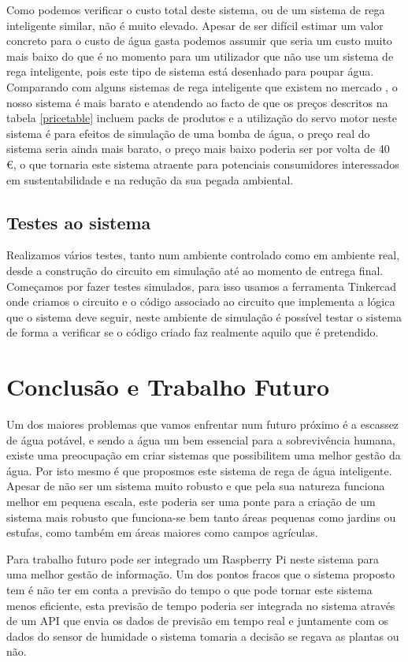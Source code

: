 \documentclass[conference]{IEEEtran}
\begin{document}
Como podemos verificar o custo total deste sistema, ou de um sistema de 
rega inteligente similar, não é muito elevado. Apesar de ser difícil estimar 
um valor concreto para o custo de água gasta podemos assumir que seria um custo 
muito mais baixo do que é no momento para um utilizador que não use um sistema de 
rega inteligente, pois este tipo de sistema está desenhado para poupar água. 
Comparando com alguns sistemas de rega inteligente que existem no 
mercado \cite{amazonOrbit} \cite{amazonNetro}, o nosso sistema é mais barato e 
atendendo ao facto de que os preços descritos na tabela \ref{pricetable} incluem packs de 
produtos e a utilização do servo motor neste sistema é para efeitos de simulação 
de uma bomba de água, o preço real do sistema seria ainda mais barato, o preço mais 
baixo poderia ser por volta de 40 €, o que tornaria este sistema atraente para 
potenciais consumidores interessados em sustentabilidade e na redução da sua pegada 
ambiental.

\subsection{Testes ao sistema}

Realizamos vários testes, tanto num ambiente controlado como em ambiente real, desde 
a construção do circuito em simulação até ao momento de entrega final. Começamos 
por fazer testes simulados, para isso usamos a ferramenta Tinkercad \cite{tinkercad} onde 
criamos o circuito e o código associado ao circuito que implementa a lógica 
que o sistema deve seguir, neste ambiente de simulação é possível testar 
o sistema de forma a verificar se o código criado faz realmente aquilo 
que é pretendido.

\section{Conclusão e Trabalho Futuro}

Um dos maiores problemas que vamos enfrentar num futuro próximo é a escassez de água potável,
e sendo a água um bem essencial para a sobrevivência humana, existe uma preocupação 
em criar sistemas que possibilitem uma melhor gestão da água. Por isto mesmo 
é que proposmos este sistema de rega de água inteligente. Apesar de não ser um 
sistema muito robusto e que pela sua natureza funciona melhor em pequena escala, este 
poderia ser uma ponte para a criação de um sistema mais robusto que funciona-se bem 
tanto áreas pequenas como jardins ou estufas, como também em áreas maiores como campos agrículas.

Para trabalho futuro pode ser integrado um Raspberry Pi neste sistema para uma melhor 
gestão de informação. Um dos pontos fracos que o sistema proposto tem é não 
ter em conta a previsão do tempo o que pode tornar este sistema menos eficiente, 
esta previsão de tempo poderia ser integrada no sistema através de um API que 
envia os dados de previsão em tempo real e juntamente com os dados do sensor de 
humidade o sistema tomaria a decisão se regava as plantas ou não.



\end{document}
